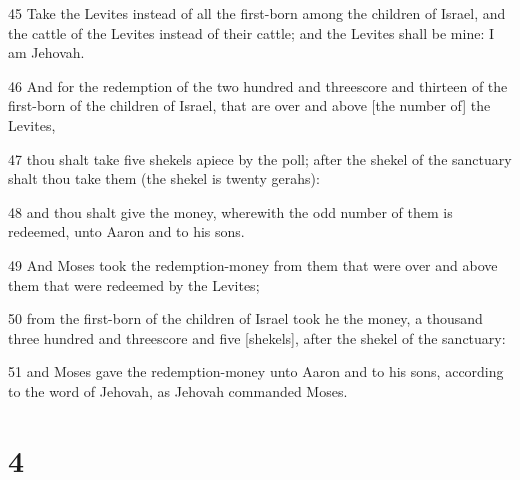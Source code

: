 \par 45 Take the Levites instead of all the first-born among the children of Israel, and the cattle of the Levites instead of their cattle; and the Levites shall be mine: I am Jehovah.
\par 46 And for the redemption of the two hundred and threescore and thirteen of the first-born of the children of Israel, that are over and above [the number of] the Levites,
\par 47 thou shalt take five shekels apiece by the poll; after the shekel of the sanctuary shalt thou take them (the shekel is twenty gerahs):
\par 48 and thou shalt give the money, wherewith the odd number of them is redeemed, unto Aaron and to his sons.
\par 49 And Moses took the redemption-money from them that were over and above them that were redeemed by the Levites;
\par 50 from the first-born of the children of Israel took he the money, a thousand three hundred and threescore and five [shekels], after the shekel of the sanctuary:
\par 51 and Moses gave the redemption-money unto Aaron and to his sons, according to the word of Jehovah, as Jehovah commanded Moses.

\chapter{4}

